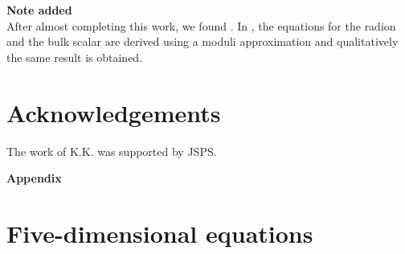 \documentclass[a4paper,11pt]{article}
\begin{document}
{\bf Note added}\\
After almost completing this work, we found \cite{BBDR2}. In
\cite{BBDR2}, the equations for the radion and the bulk scalar 
are derived using a moduli approximation and qualitatively the 
same result is obtained.


\section*{Acknowledgements}
The work of K.K. was supported by JSPS.

\appendix
\begin{flushleft}
{\Large\bfseries Appendix}
\end{flushleft}

\section{Five-dimensional equations \label{APP1} }
\end{document}
